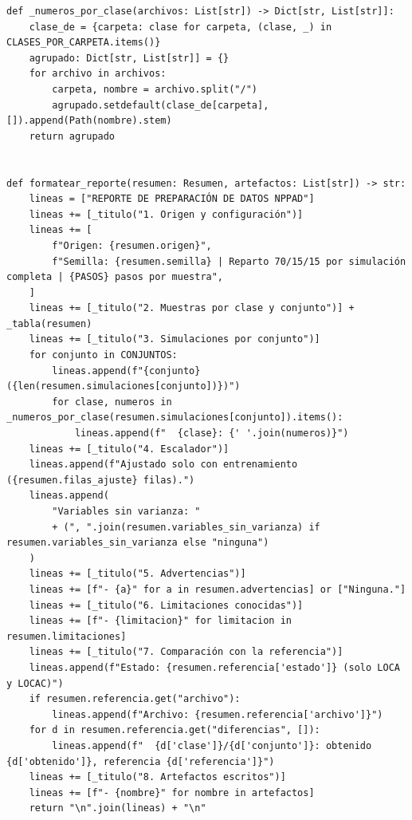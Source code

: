 \documentclass[12pt,a4paper]{article}
\begin{document}
\begin{lstlisting}
def _numeros_por_clase(archivos: List[str]) -> Dict[str, List[str]]:
    clase_de = {carpeta: clase for carpeta, (clase, _) in CLASES_POR_CARPETA.items()}
    agrupado: Dict[str, List[str]] = {}
    for archivo in archivos:
        carpeta, nombre = archivo.split("/")
        agrupado.setdefault(clase_de[carpeta], []).append(Path(nombre).stem)
    return agrupado


def formatear_reporte(resumen: Resumen, artefactos: List[str]) -> str:
    lineas = ["REPORTE DE PREPARACIÓN DE DATOS NPPAD"]
    lineas += [_titulo("1. Origen y configuración")]
    lineas += [
        f"Origen: {resumen.origen}",
        f"Semilla: {resumen.semilla} | Reparto 70/15/15 por simulación completa | {PASOS} pasos por muestra",
    ]
    lineas += [_titulo("2. Muestras por clase y conjunto")] + _tabla(resumen)
    lineas += [_titulo("3. Simulaciones por conjunto")]
    for conjunto in CONJUNTOS:
        lineas.append(f"{conjunto} ({len(resumen.simulaciones[conjunto])})")
        for clase, numeros in _numeros_por_clase(resumen.simulaciones[conjunto]).items():
            lineas.append(f"  {clase}: {' '.join(numeros)}")
    lineas += [_titulo("4. Escalador")]
    lineas.append(f"Ajustado solo con entrenamiento ({resumen.filas_ajuste} filas).")
    lineas.append(
        "Variables sin varianza: "
        + (", ".join(resumen.variables_sin_varianza) if resumen.variables_sin_varianza else "ninguna")
    )
    lineas += [_titulo("5. Advertencias")]
    lineas += [f"- {a}" for a in resumen.advertencias] or ["Ninguna."]
    lineas += [_titulo("6. Limitaciones conocidas")]
    lineas += [f"- {limitacion}" for limitacion in resumen.limitaciones]
    lineas += [_titulo("7. Comparación con la referencia")]
    lineas.append(f"Estado: {resumen.referencia['estado']} (solo LOCA y LOCAC)")
    if resumen.referencia.get("archivo"):
        lineas.append(f"Archivo: {resumen.referencia['archivo']}")
    for d in resumen.referencia.get("diferencias", []):
        lineas.append(f"  {d['clase']}/{d['conjunto']}: obtenido {d['obtenido']}, referencia {d['referencia']}")
    lineas += [_titulo("8. Artefactos escritos")]
    lineas += [f"- {nombre}" for nombre in artefactos]
    return "\n".join(lineas) + "\n"
\end{lstlisting}
\end{document}
